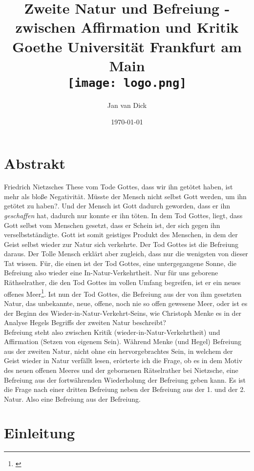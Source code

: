 \documentclass[12pt, a4paper, openany]{report}
\title{
    {Zweite Natur und Befreiung - zwischen Affirmation und Kritik}\\
    {\large Goethe Universität Frankfurt am Main}\\
    {\texttt{[image: logo.png]}}
}
\author{Jan van Dick}
\date{\today}
\newcommand\frontmatter{ \cleardoublepage \pagenumbering{roman}}
\newcommand\mainmatter{ \cleardoublepage \pagenumbering{arabic}}
\begin{document}
\frontmatter
\maketitle

\chapter*{Abstrakt}
Friedrich Nietzsches These vom Tode Gottes, dass \glqq wir\grqq{} ihn getötet haben, ist mehr als bloße Negativität. 
Müsste der Mensch nicht selbst Gott werden, um ihn getötet zu haben?. 
Und der Mensch ist Gott dadurch geworden, dass er ihn \textit{geschaffen} hat, dadurch nur konnte er ihn töten. 
In dem Tod Gottes, liegt, dass Gott selbst vom Menschen gesetzt, dass er Schein ist, der sich gegen ihn verselbstständigte.
Gott ist somit geistiges Produkt des Menschen, in dem der Geist selbst wieder zur Natur sich verkehrte.
Der Tod Gottes ist die Befreiung daraus.
Der \glqq Tolle Mensch\grqq{} erklärt aber zugleich, dass nur die wenigsten von dieser Tat wissen. 
Für, die einen ist der Tod Gottes, eine untergegangene Sonne, die Befreiung also wieder eine In-Natur-Verkehrtheit.
Nur für uns \glqq geborene Räthselrather\grqq, die den Tod Gottes im vollen Umfang begreifen, ist er ein \glqq neues offenes Meer\grqq\footnote{\citeauthor[][573]{nietzsche_morgenrote_1999}}.
Ist nun der Tod Gottes, die Befreiung aus der von ihm gesetzten Natur, das unbekannte, neue, offene, noch nie so offen gewesene Meer, oder ist es der Beginn des Wieder-in-Natur-Verkehrt-Seins, wie Christoph Menke es in der Analyse Hegels Begriffs der zweiten Natur beschreibt?\\
Befreiung steht also zwischen Kritik (wieder-in-Natur-Verkehrtheit) und Affirmation (Setzen von eigenem Sein).
Während Menke (und Hegel) Befreiung aus der zweiten Natur, nicht ohne ein hervorgebrachtes Sein, in welchem der Geist wieder in Natur verfällt lesen, erörterte ich die Frage, ob es in dem Motiv des \glqq neuen offenen Meeres\grqq{} und der gebornenen Rätselrather bei Nietzsche, eine Befreiung aus der fortwährenden Wiederholung der Befreiung geben kann.
Es ist die Frage nach einer dritten Befreiung neben der Befreiung aus der 1. und der 2. Natur. 
Also eine Befreiung aus der Befreiung.


\tableofcontents

\mainmatter

\chapter{Einleitung}
\end{document}
